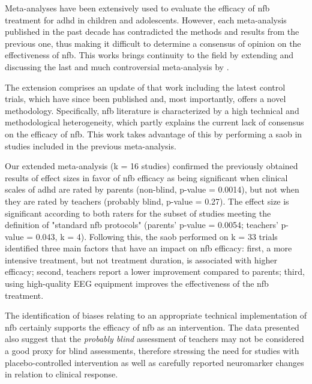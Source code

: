 

\noindent Meta-analyses have been extensively used to
evaluate the efficacy of \gls{nfb} treatment for \gls{adhd} in children and adolescents. 
However, each meta-analysis published in the past decade has contradicted the methods and
results from the previous one, thus making it difficult to determine a consensus of opinion
on the effectiveness of \gls{nfb}. This works brings continuity to the field by extending and discussing the last and much 
controversial meta-analysis by \citet{Cortese2016}. 

The extension comprises an update of that work including the latest control trials, 
which have since been published and, most importantly, offers a
novel methodology. Specifically, \gls{nfb} literature is characterized 
by a high technical and methodological heterogeneity, which partly explains the current lack of consensus on 
the efficacy of \gls{nfb}. This work takes advantage of this by performing a \gls{saob} in studies included in the previous meta-analysis.

Our extended meta-analysis (k = 16 studies) confirmed the previously
obtained results of effect sizes in favor of \gls{nfb} efficacy as being significant when clinical scales of \gls{adhd}
are rated by parents (non-blind, p-value = 0.0014), but not when they are rated by
teachers (probably blind, p-value = 0.27). The effect size is significant
according to both raters for the subset of studies meeting the definition of
"standard \gls{nfb} protocols" (parents' p-value = 0.0054; teachers' p-value = 0.043, k
= 4). Following this, the \gls{saob} performed on k = 33 trials 
identified three main factors that have an impact on \gls{nfb} efficacy: first, a more
intensive treatment, but not treatment duration, is associated with higher
efficacy; second, teachers report a lower improvement compared to parents;
third, using high-quality EEG equipment improves the effectiveness of the \gls{nfb} treatment.

The identification of biases relating to an appropriate technical implementation of \gls{nfb} 
certainly supports the efficacy of \gls{nfb} as an intervention. The data presented also suggest that the \emph{probably blind} 
assessment of teachers may not be considered a good proxy for blind assessments, therefore stressing the need for 
studies with placebo-controlled intervention as well as carefully reported neuromarker changes in relation to clinical response.



